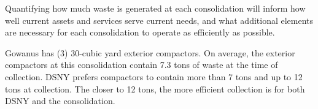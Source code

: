 
    Quantifying how much waste is generated at each consolidation will inform how well current assets and services serve current needs, and what additional elements are necessary for each consolidation to operate as efficiently as possible.
    
    Gowanus has (3) 30-cubic yard exterior compactors. On average, the exterior compactors at this consolidation contain 7.3 tons of waste at the time of collection. DSNY prefers compactors to contain more than 7 tons and up to 12 tons at collection. The closer to 12 tons, the more efficient collection is for both DSNY and the consolidation.